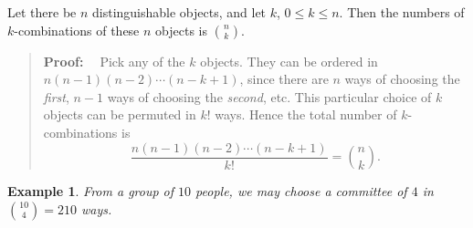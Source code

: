 \documentclass[11pt, openany]{book}
\theoremstyle{change} \theoremheaderfont{\blue\sffamily\bfseries}
\newtheorem{exa}[thm]{Example}
\newcommand{\proofsymbol}{\Pisymbol{pzd}{113}}
\theoremstyle{nonumberplain} \theoremheaderfont{\sffamily\bfseries}
\newenvironment{pf}[0]{\itshape\begin{quote}{\bf Proof: \ }}{\proofsymbol\end{quote}}
\def\binom#1#2{{#1\choose#2}}
\newcommand{\dis}{\displaystyle}
\newcommand{\í}{\'{\i}}
\begin{document}
\begin{thm}
Let there be $n$ distinguishable objects, and let $k$, $0 \leq k
\leq n$. Then the numbers of $k$-combinations of these $n$ objects
is $\dis{\binom{n}{k}}$.
\end{thm}
\begin{pf}
Pick any of the $k$ objects. They can be ordered in $n(n - 1)(n - 2)
\cdots (n - k + 1)$, since there are $n$ ways of choosing the {\em
first}, $n - 1$ ways of choosing the {\em second}, etc. This
particular choice of $k$ objects can be permuted in $k!$ ways. Hence
the total number of $k$-combinations is $$ \frac{n(n - 1)(n - 2)
\cdots (n - k + 1)}{k!}=  \binom{n}{k}.$$
\end{pf}
\begin{exa}
From a group of $10$ people, we may choose a committee of $4$ in
$\dis{\binom{10}{4} = 210} $ ways.
\end{exa}
\end{document}
